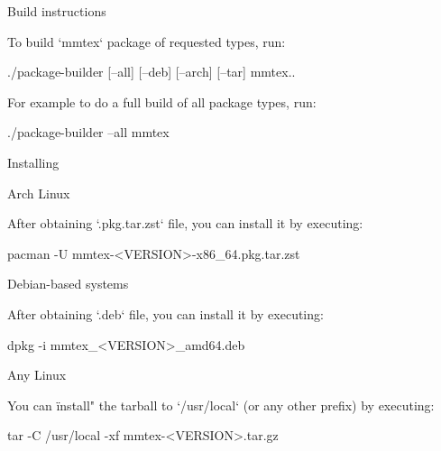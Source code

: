 \secc Build instructions

To build `mmtex` package of requested types, run:

\begtt
./package-builder [--all] [--deb] [--arch] [--tar] mmtex..
\endtt

For example to do a full build of all package types, run:

\begtt
./package-builder --all mmtex
\endtt

\sec Installing \MMTeX

\secc Arch Linux

After obtaining `.pkg.tar.zst` file, you can install it by executing:

\begtt
pacman -U mmtex-<VERSION>-x86_64.pkg.tar.zst
\endtt

\secc Debian-based systems

After obtaining `.deb` file, you can install it by executing:

\begtt
dpkg -i mmtex_<VERSION>_amd64.deb
\endtt

\secc Any Linux

You can \"install" the tarball to `/usr/local` (or any other prefix) by
executing:

\begtt
tar -C /usr/local -xf mmtex-<VERSION>.tar.gz
\endtt

\bye
